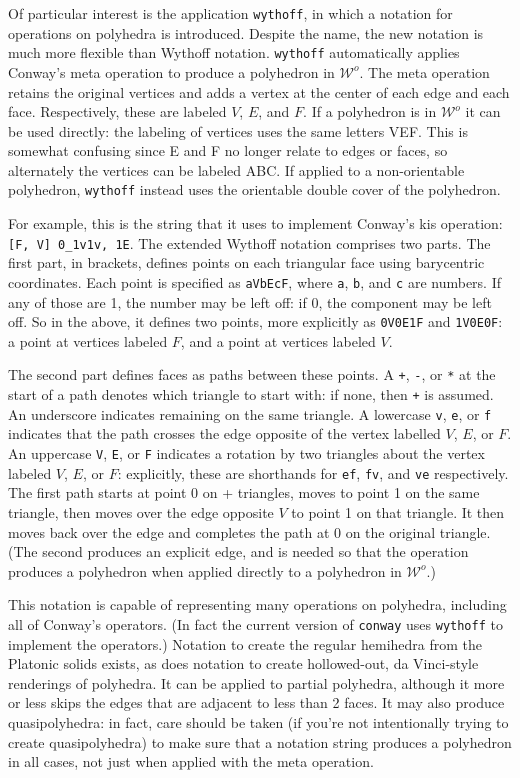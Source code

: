 \documentclass[12pt]{amsart}%
\begin{document}
Of particular interest is the application \texttt{wythoff}, in which a notation
for operations on polyhedra is introduced. Despite the name, the new notation
is much more flexible than Wythoff notation. \texttt{wythoff} automatically
applies Conway's meta operation to produce a polyhedron in $\mathcal{W}^o$. The
meta operation retains the original vertices and adds a vertex at the center of
each edge and each face. Respectively, these are labeled $V$, $E$, and $F$. If
a polyhedron is in $\mathcal{W}^o$ it can be used directly: the labeling of
vertices uses the same letters VEF. This is somewhat confusing since E and F no
longer relate to edges or faces, so alternately the vertices can be labeled
ABC. If applied to a non-orientable polyhedron, \texttt{wythoff} instead uses
the orientable double cover of the polyhedron.

For example, this is the string that it uses to implement Conway's kis
operation: \texttt{[F, V] 0\_1v1v, 1E}. The extended Wythoff notation comprises
two parts. The first part, in brackets, defines points on each triangular face
using barycentric coordinates. Each point is specified as \texttt{aVbEcF}, where
\texttt{a}, \texttt{b}, and \texttt{c} are numbers. If any of those are 1, the
number may be left off: if 0, the component may be left off. So in the above,
it defines two points, more explicitly as \texttt{0V0E1F} and \texttt{1V0E0F}:
a point at vertices labeled $F$, and a point at vertices labeled $V$.

The second part defines faces as paths between these points. A \texttt{+},
\texttt{-}, or \texttt{*} at the start of a path denotes which triangle to
start with: if none, then \texttt{+} is assumed. An underscore indicates
remaining on the same triangle. A lowercase \texttt{v}, \texttt{e}, or
\texttt{f} indicates that the path crosses the edge opposite of the vertex
labelled $V$, $E$, or $F$. An uppercase \texttt{V}, \texttt{E}, or \texttt{F}
indicates a rotation by two triangles about the vertex labeled $V$, $E$, or $F$:
explicitly, these are shorthands for \texttt{ef}, \texttt{fv}, and \texttt{ve}
respectively. The first path starts at point 0 on + triangles, moves to point 1
on the same triangle, then moves over the edge opposite $V$ to point 1 on
that triangle. It then moves back over the edge and completes the path at 0
on the original triangle. (The second produces an explicit edge, and is needed
so that the operation produces a polyhedron when applied directly to a
polyhedron in $\mathcal{W}^o$.)

This notation is capable of representing many operations on polyhedra,
including all of Conway's operators. (In fact the current version of
\texttt{conway} uses \texttt{wythoff} to implement the operators.) Notation to
create the regular hemihedra from the Platonic solids exists, as does notation
to create hollowed-out, da Vinci-style renderings of polyhedra. It can be
applied to partial polyhedra, although it more or less skips the edges that
are adjacent to less than 2 faces. It may also produce quasipolyhedra: in
fact, care should be taken (if you're not intentionally trying to create
quasipolyhedra) to make sure that a notation string produces a polyhedron in
all cases, not just when applied with the meta operation.
\end{document}
